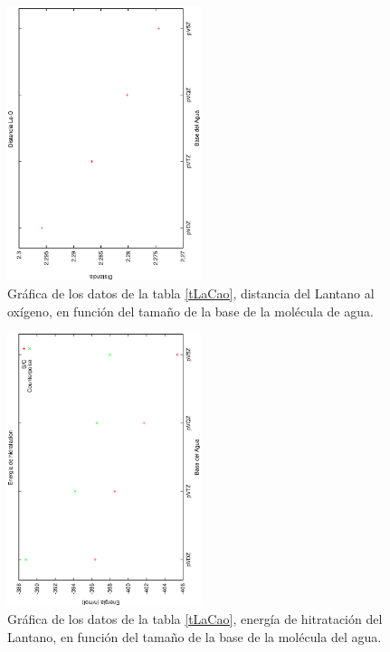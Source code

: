 
{\normalsize
}

\begin{figure}[h]
\centering
\includegraphics[height=8cm,angle=-90]{../Tablas/laCdist.ps}
\caption{\small{Gr\'afica de los datos de la tabla \ref{tLaCao},
distancia del Lantano al ox\'igeno, en funci\'on del tama\~no
de la base de la mol\'ecula de agua.}}
\label{fLaCD}
\end{figure}
\begin{figure}[h]
\centering
\includegraphics[height=8cm,angle=-90]{../Tablas/laCeneh.ps}
\caption{\small{Gr\'afica de los datos de la tabla \ref{tLaCao},
energ\'ia de hitrataci\'on del Lantano, en funci\'on del tama\~no
de la base de la mol\'ecula del agua.}}
\label{fLaCE}
\end{figure}

